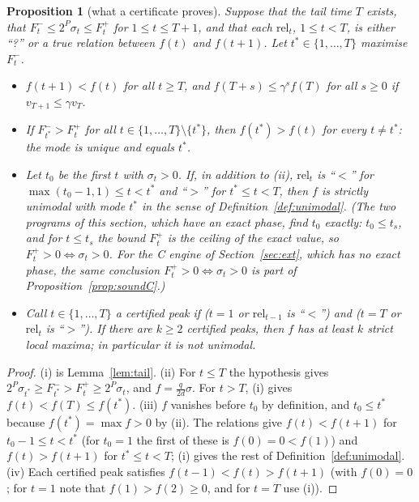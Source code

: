 \documentclass[11pt,a4paper]{article}
\newtheorem{proposition}[theorem]{Proposition}
\theoremstyle{definition}
\theoremstyle{remark}
\begin{document}
\begin{proposition}[what a certificate proves]\label{prop:sound}
Suppose that the tail time $T$ exists, that $F^-_t\le2^P\sigma_t\le F^+_t$ for $1\le t\le T+1$, and that each $\mathrm{rel}_t$, $1\le t<T$, is either ``?'' or a true relation between $f(t)$ and $f(t+1)$. Let $t^*\in\{1,\dots,T\}$ maximise $F^-_t$.
\begin{itemize}
\item[(i)] $f(t+1)<f(t)$ for all $t\ge T$, and $f(T+s)\le\gamma^sf(T)$ for all $s\ge0$ if $v_{T+1}\le\gamma v_T$.
\item[(ii)] If $F^-_{t^*}>F^+_t$ for all $t\in\{1,\dots,T\}\setminus\{t^*\}$, then $f(t^*)>f(t)$ for every $t\ne t^*$: the mode is unique and equals $t^*$.
\item[(iii)] Let $t_0$ be the first $t$ with $\sigma_t>0$. If, in addition to (ii), $\mathrm{rel}_t$ is ``$<$'' for $\max(t_0-1,1)\le t<t^*$ and ``$>$'' for $t^*\le t<T$, then $f$ is strictly unimodal with mode $t^*$ in the sense of Definition~\ref{def:unimodal}. (The two programs of this section, which have an exact phase, find $t_0$ exactly: $t_0\le t_s$, and for $t\le t_s$ the bound $F^+_t$ is the ceiling of the exact value, so $F^+_t>0\iff\sigma_t>0$. For the C engine of Section~\ref{sec:ext}, which has no exact phase, the same conclusion $F^+_t>0\iff\sigma_t>0$ is part of Proposition~\ref{prop:soundC}.)
\item[(iv)] Call $t\in\{1,\dots,T\}$ a \emph{certified peak} if ($t=1$ or $\mathrm{rel}_{t-1}$ is ``$<$'') and ($t=T$ or $\mathrm{rel}_t$ is ``$>$''). If there are $k\ge2$ certified peaks, then $f$ has at least $k$ strict local maxima; in particular it is not unimodal.
\end{itemize}
\end{proposition}
\begin{proof}
(i) is Lemma~\ref{lem:tail}.
(ii) For $t\le T$ the hypothesis gives $2^P\sigma_{t^*}\ge F^-_{t^*}>F^+_t\ge2^P\sigma_t$, and $f=\frac q{2d}\sigma$. For $t>T$, (i) gives $f(t)<f(T)\le f(t^*)$.
(iii) $f$ vanishes before $t_0$ by definition, and $t_0\le t^*$ because $f(t^*)=\max f>0$ by (ii). The relations give $f(t)<f(t+1)$ for $t_0-1\le t<t^*$ (for $t_0=1$ the first of these is $f(0)=0<f(1)$) and $f(t)>f(t+1)$ for $t^*\le t<T$; (i) gives the rest of Definition~\ref{def:unimodal}.
(iv) Each certified peak satisfies $f(t-1)<f(t)>f(t+1)$ (with $f(0)=0$; for $t=1$ note that $f(1)>f(2)\ge0$, and for $t=T$ use (i)).
\end{proof}
\end{document}
